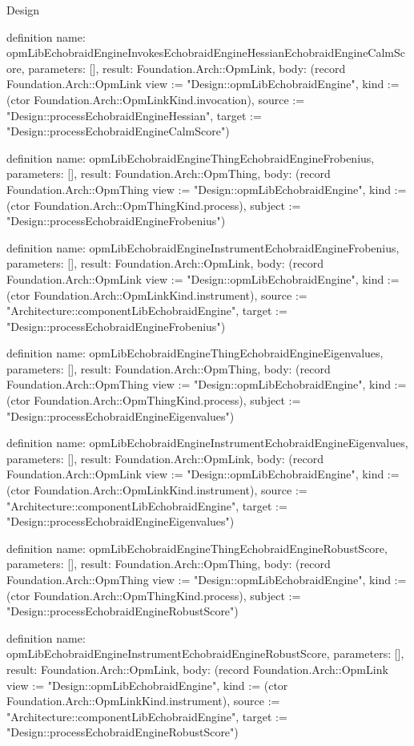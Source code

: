 \begin{lexlean}{Design}
\begin{semanticmodule}
definition{
  name: opmLibEchobraidEngineInvokesEchobraidEngineHessianEchobraidEngineCalmScore,
  parameters: [],
  result: Foundation.Arch::OpmLink,
  body: (record Foundation.Arch::OpmLink {view := "Design::opmLibEchobraidEngine", kind := (ctor Foundation.Arch::OpmLinkKind.invocation), source := "Design::processEchobraidEngineHessian", target := "Design::processEchobraidEngineCalmScore"})
}

definition{
  name: opmLibEchobraidEngineThingEchobraidEngineFrobenius,
  parameters: [],
  result: Foundation.Arch::OpmThing,
  body: (record Foundation.Arch::OpmThing {view := "Design::opmLibEchobraidEngine", kind := (ctor Foundation.Arch::OpmThingKind.process), subject := "Design::processEchobraidEngineFrobenius"})
}

definition{
  name: opmLibEchobraidEngineInstrumentEchobraidEngineFrobenius,
  parameters: [],
  result: Foundation.Arch::OpmLink,
  body: (record Foundation.Arch::OpmLink {view := "Design::opmLibEchobraidEngine", kind := (ctor Foundation.Arch::OpmLinkKind.instrument), source := "Architecture::componentLibEchobraidEngine", target := "Design::processEchobraidEngineFrobenius"})
}

definition{
  name: opmLibEchobraidEngineThingEchobraidEngineEigenvalues,
  parameters: [],
  result: Foundation.Arch::OpmThing,
  body: (record Foundation.Arch::OpmThing {view := "Design::opmLibEchobraidEngine", kind := (ctor Foundation.Arch::OpmThingKind.process), subject := "Design::processEchobraidEngineEigenvalues"})
}

definition{
  name: opmLibEchobraidEngineInstrumentEchobraidEngineEigenvalues,
  parameters: [],
  result: Foundation.Arch::OpmLink,
  body: (record Foundation.Arch::OpmLink {view := "Design::opmLibEchobraidEngine", kind := (ctor Foundation.Arch::OpmLinkKind.instrument), source := "Architecture::componentLibEchobraidEngine", target := "Design::processEchobraidEngineEigenvalues"})
}

definition{
  name: opmLibEchobraidEngineThingEchobraidEngineRobustScore,
  parameters: [],
  result: Foundation.Arch::OpmThing,
  body: (record Foundation.Arch::OpmThing {view := "Design::opmLibEchobraidEngine", kind := (ctor Foundation.Arch::OpmThingKind.process), subject := "Design::processEchobraidEngineRobustScore"})
}

definition{
  name: opmLibEchobraidEngineInstrumentEchobraidEngineRobustScore,
  parameters: [],
  result: Foundation.Arch::OpmLink,
  body: (record Foundation.Arch::OpmLink {view := "Design::opmLibEchobraidEngine", kind := (ctor Foundation.Arch::OpmLinkKind.instrument), source := "Architecture::componentLibEchobraidEngine", target := "Design::processEchobraidEngineRobustScore"})
}


\end{semanticmodule}
\end{lexlean}
